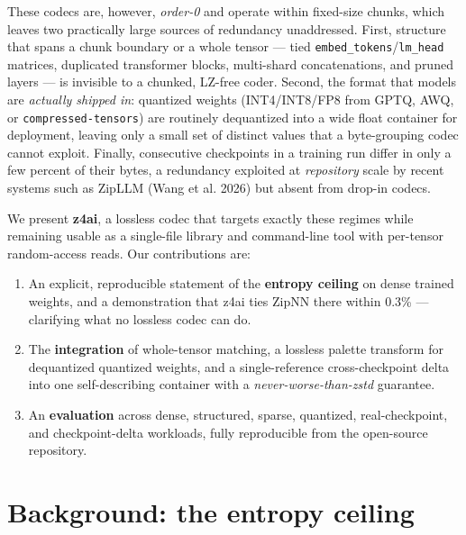 \documentclass[
]{article}
\providecommand{\tightlist}{%
  \setlength{\itemsep}{0pt}\setlength{\parskip}{0pt}}
\begin{document}
These codecs are, however, \emph{order-0} and operate within fixed-size
chunks, which leaves two practically large sources of redundancy
unaddressed. First, structure that spans a chunk boundary or a whole
tensor --- tied \texttt{embed\_tokens}/\texttt{lm\_head} matrices,
duplicated transformer blocks, multi-shard concatenations, and pruned
layers --- is invisible to a chunked, LZ-free coder. Second, the format
that models are \emph{actually shipped in}: quantized weights
(INT4/INT8/FP8 from GPTQ, AWQ, or \texttt{compressed-tensors}) are
routinely dequantized into a wide float container for deployment,
leaving only a small set of distinct values that a byte-grouping codec
cannot exploit. Finally, consecutive checkpoints in a training run
differ in only a few percent of their bytes, a redundancy exploited at
\emph{repository} scale by recent systems such as ZipLLM (Wang et al.
2026) but absent from drop-in codecs.

We present \textbf{z4ai}, a lossless codec that targets exactly these
regimes while remaining usable as a single-file library and command-line
tool with per-tensor random-access reads. Our contributions are:

\begin{enumerate}
\def\labelenumi{\arabic{enumi}.}
\tightlist
\item
  An explicit, reproducible statement of the \textbf{entropy ceiling} on
  dense trained weights, and a demonstration that z4ai ties ZipNN there
  within 0.3\% --- clarifying what no lossless codec can do.
\item
  The \textbf{integration} of whole-tensor matching, a lossless palette
  transform for dequantized quantized weights, and a single-reference
  cross-checkpoint delta into one self-describing container with a
  \emph{never-worse-than-zstd} guarantee.
\item
  An \textbf{evaluation} across dense, structured, sparse, quantized,
  real-checkpoint, and checkpoint-delta workloads, fully reproducible
  from the open-source repository.
\end{enumerate}

\section{Background: the entropy
ceiling}\label{background-the-entropy-ceiling}
\end{document}
